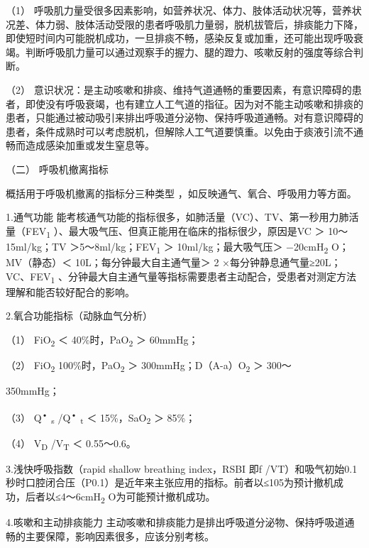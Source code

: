 （1）
呼吸肌力量受很多因素影响，如营养状况、体力、肢体活动状况等，营养状况差、体力弱、肢体活动受限的患者呼吸肌力量弱，脱机拔管后，排痰能力下降，即使短时间内可能脱机成功，一旦排痰不畅，感染反复或加重，还可能出现呼吸衰竭。判断呼吸肌力量可以通过观察手的握力、腿的蹬力、咳嗽反射的强度等综合判断。

（2）
意识状况：是主动咳嗽和排痰、维持气道通畅的重要因素，有意识障碍的患者，即使没有呼吸衰竭，也有建立人工气道的指征。因为对不能主动咳嗽和排痰的患者，只能通过被动吸引来排出呼吸道分泌物、保持呼吸道通畅。对有意识障碍的患者，条件成熟时可以考虑脱机，但解除人工气道要慎重。以免由于痰液引流不通畅而造成感染加重或发生窒息等。

\hypertarget{text00371.htmlux5cux23CHP16-3-5-3-2}{}
（二） 呼吸机撤离指标

概括用于呼吸机撤离的指标分三种类型 ，如反映通气、氧合、呼吸用力等方面。

1.通气功能
能考核通气功能的指标很多，如肺活量（VC）、TV、第一秒用力肺活量（FEV\textsubscript{1}
）、最大吸气压、但真正能用在临床的指标很少，原因是VC ＞ 10～15ml/kg；TV
＞5～8ml/kg；FEV\textsubscript{1} ＞ 10ml/kg；最大吸气压＞
−20cmH\textsubscript{2} O；MV（静态）＜ 10L；每分钟最大自主通气量＞ 2
×每分钟静息通气量≥20L；VC、FEV\textsubscript{1}
、分钟最大自主通气量等指标需要患者主动配合，受患者对测定方法理解和能否较好配合的影响。

2.氧合功能指标（动脉血气分析）

（1） FiO\textsubscript{2} ＜ 40\%时，PaO\textsubscript{2} ＞ 60mmHg；

（2） FiO\textsubscript{2} 100\%时，PaO\textsubscript{2} ＞
300mmHg；D（A-a）O\textsubscript{2} ＞ 300～

350mmHg；

（3） Q\textsuperscript{•} \textsubscript{s} /Q\textsuperscript{•}
\textsubscript{t} ＜ 15\%，SaO\textsubscript{2} ＞ 85\%；

（4） V\textsubscript{D} /V\textsubscript{T} ＜ 0.55～0.6。

3.浅快呼吸指数（rapid shallow breathing index，RSBI 即f
/VT）和吸气初始0.1秒时口腔闭合压（P0.1）是近年来主张应用的指标。前者以≤105为预计撤机成功，后者以≤4～6cmH\textsubscript{2}
O为可能预计撤机成功。

4.咳嗽和主动排痰能力
主动咳嗽和排痰能力是排出呼吸道分泌物、保持呼吸道通畅的主要保障，影响因素很多，应该分别考核。

